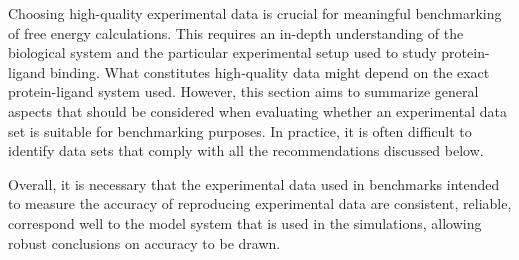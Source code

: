 \documentclass[9pt,bestpractices]{livecoms}
\begin{document}
Choosing high-quality experimental data is crucial for  meaningful benchmarking of free energy calculations. This requires an in-depth understanding of the biological system and the particular experimental setup used to study protein-ligand binding. What constitutes high-quality data might depend on the exact protein-ligand system used. However, this section aims to summarize general aspects that should be considered when evaluating whether an experimental data set is suitable for benchmarking purposes. In practice, it is often difficult to identify data sets that comply with all the recommendations discussed below.

Overall, it is necessary that the experimental data used in benchmarks intended to measure the accuracy of reproducing experimental data are consistent, reliable, correspond well to the model system that is used in the simulations, allowing robust conclusions on accuracy to be drawn.
\end{document}
